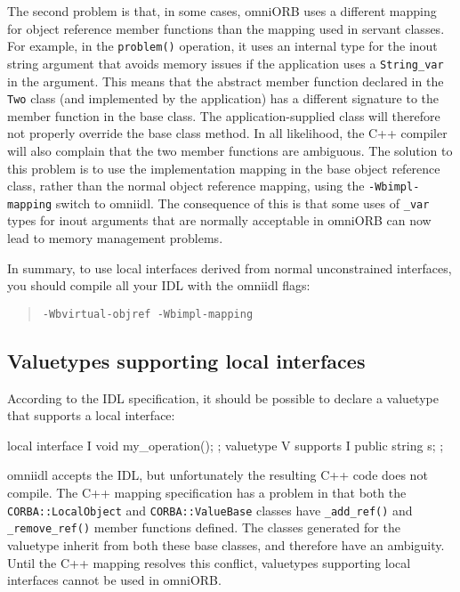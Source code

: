 \documentclass[11pt,twoside,a4paper]{book}
\newcommand{\type}[1]{\texttt{#1}}
\newcommand{\code}[1]{\texttt{#1}}
\newcommand{\op}[1]{\texttt{#1()}}
\newcommand{\cmdline}[1]{\texttt{#1}}
\newcommand{\dsc}{\discretionary{}{}{}}
\begin{document}
The second problem is that, in some cases, omniORB uses a different
mapping for object reference member functions than the mapping used in
servant classes. For example, in the \op{problem} operation, it uses
an internal type for the inout string argument that avoids memory
issues if the application uses a \type{String\_var} in the argument.
This means that the abstract member function declared in the
\type{Two} class (and implemented by the application) has a different
signature to the member function in the base class. The
application-supplied class will therefore not properly override the
base class method. In all likelihood, the C++ compiler will also
complain that the two member functions are ambiguous. The solution to
this problem is to use the implementation mapping in the base object
reference class, rather than the normal object reference mapping,
using the \cmdline{-Wbimpl-mapping} switch to omniidl. The consequence
of this is that some uses of \code{\_var} types for inout arguments
that are normally acceptable in omniORB can now lead to memory
management problems.

In summary, to use local interfaces derived from normal unconstrained
interfaces, you should compile all your IDL with the omniidl flags:

\begin{quote}
\cmdline{-Wbvirtual-objref -Wbimpl-mapping}
\end{quote}


\subsection{Valuetypes supporting local interfaces}

According to the IDL specification, it should be possible to declare a
valuetype that supports a local interface:

\begin{idllisting}
local interface I {
  void my_operation();
};
valuetype V supports I {
  public string s;
};
\end{idllisting}

omniidl accepts the IDL, but unfortunately the resulting C++ code does
not compile. The C++ mapping specification has a problem in that both
the \type{CORBA::\dsc{}LocalObject} and \type{CORBA::ValueBase}
classes have \op{\_add\_ref} and \op{\_remove\_\dsc{}ref} member
functions defined. The classes generated for the valuetype inherit
from both these base classes, and therefore have an ambiguity. Until
the C++ mapping resolves this conflict, valuetypes supporting local
interfaces cannot be used in omniORB.
\end{document}
